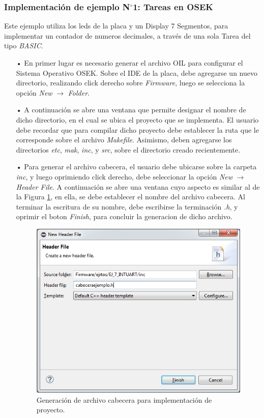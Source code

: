 \documentclass[12pt,letterpaper]{article}
\begin{document}
\subsubsection{Implementación de ejemplo N$^{\circ}$1: Tareas en OSEK}\label{sec:tareasOSEK}
Este ejemplo utiliza los leds de la placa y un Display 7 Segmentos, para implementar un contador de numeros decimales, a través de una sola Tarea del tipo \textit{BASIC}.
\begin{enumerate}
\item[•]En primer lugar es necesario generar el archivo OIL para configurar el Sistema Operativo OSEK. Sobre el IDE de la placa, debe agregarse un nuevo directorio, realizando click derecho sobre \textit{Firmware}, luego se selecciona la opción \textit{New} $\rightarrow$ \textit{Folder}.
\item[•]A continuación se abre una ventana que permite designar el nombre de dicho directorio, en el cual se ubica el proyecto que se implementa. El usuario debe recordar que para compilar dicho proyecto debe establecer la ruta que le corresponde sobre el archivo \textit{Makefile}. Asimismo, deben agregarse los directorios \textit{etc}, \textit{mak}, \textit{inc}, y \textit{src}, sobre el directorio creado recientemente.
\item[•]Para generar el archivo cabecera, el usuario debe ubicarse sobre la carpeta \textit{inc}, y luego oprimiendo click derecho, debe seleccionar la opción \textit{New} $\rightarrow$ \textit{Header File}. A continuación se abre una ventana cuyo aspecto es similar al de la Figura \ref{archivocabecera}, en ella, se debe establecer el nombre del archivo cabecera. Al terminar la escritura de su nombre, debe escribirse la terminación \textit{.h}, y oprimir el boton \textit{Finish}, para concluir la generacion de dicho archivo.
\begin{figure}[H]
\centering
\includegraphics[width=8 cm]{figuras/f27.png}
\caption{Generación de archivo cabecera para implementación de proyecto.}
\label{archivocabecera}
\end{figure}


\end{enumerate}
\end{document}
